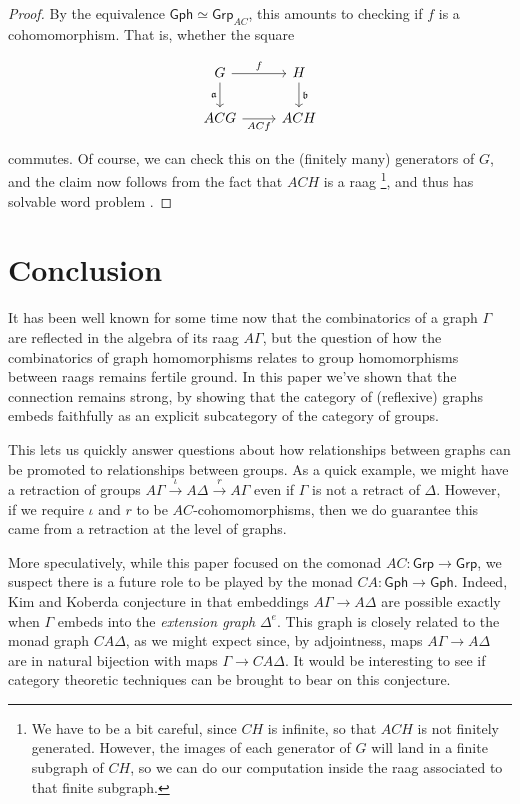 \documentclass[12pt]{article}
\theoremstyle{definition}
\theoremstyle{theorem}
\newcommand*{\catFont}[1]{\mathsf{#1}}
\newcommand{\Grp}{\catFont{Grp}}
\begin{document}
\begin{proof}
    By the equivalence $\mathsf{Gph} \simeq \Grp_{AC}$, this amounts to 
    checking if $f$ is a cohomomorphism. That is, whether the square

    \[
        \begin{tikzcd}
            G & H \\
            ACG & ACH
            \arrow["f", from=1-1, to=1-2]
            \arrow["\mathfrak{a}"', from=1-1, to=2-1]
            \arrow["ACf"', from=2-1, to=2-2]
            \arrow["\mathfrak{b}", from=1-2, to=2-2]
        \end{tikzcd}
    \]

    commutes. Of course, we can check this on the (finitely many) generators
    of $G$, 
    and the claim now follows from the fact that $ACH$ is a raag
    \footnote{We have to be a bit careful, since $CH$ is infinite, so that 
    $ACH$ is not finitely generated. However, the images of each generator 
    of $G$ will land in a finite subgraph of $CH$, so we can do our 
    computation inside the raag associated to that finite subgraph.}, and thus
    has solvable word problem \cite{charneyIntroductionRightangledArtin2006}.
\end{proof}


\section{Conclusion}
\label{conclusion}

It has been well known for some time now that the combinatorics of a graph
$\Gamma$ are reflected in the algebra of its raag $A\Gamma$, but the 
question of how the combinatorics of graph homomorphisms relates to 
group homomorphisms between raags remains fertile ground. In this paper we've 
shown that the connection remains strong, by showing that the category of
(reflexive) graphs embeds faithfully as an explicit subcategory of 
the category of groups. 

This lets us quickly answer questions about how relationships between 
graphs can be promoted to relationships between groups. As a quick 
example, we might have a retraction of groups 
$A\Gamma \overset{\iota}{\to} A\Delta \overset{r}{\to} A\Gamma$ even if
$\Gamma$ is not a retract of $\Delta$. However, if we require $\iota$
and $r$ to be $AC$-cohomomorphisms, then we do guarantee this came from
a retraction at the level of graphs.

More speculatively, while this paper focused on the comonad $AC : \Grp \to \Grp$,
we suspect there is a future role to be played by the monad 
$CA : \mathsf{Gph} \to \mathsf{Gph}$. Indeed, Kim and Koberda conjecture 
in \cite{kimEmbedabilityRightangledArtin2013} that embeddings 
$A\Gamma \to A \Delta$ are possible exactly when $\Gamma$ embeds into the
\emph{extension graph} $\Delta^e$. This graph is closely related to the 
monad graph $CA\Delta$, as we might expect since, by adjointness, 
maps $A\Gamma \to A \Delta$ are in natural bijection with maps 
$\Gamma \to CA \Delta$. It would be interesting to see if category theoretic
techniques can be brought to bear on this conjecture.



\newpage
\nocite{*}


\end{document}
